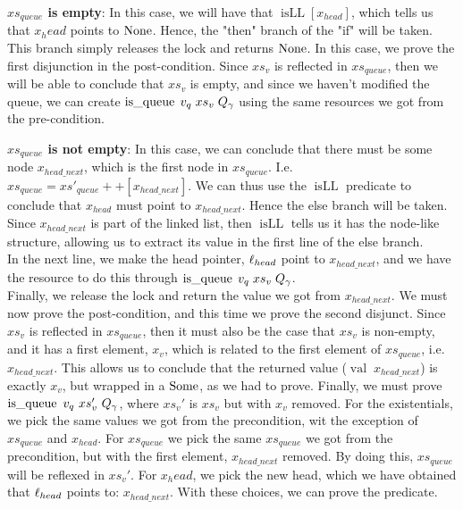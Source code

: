 \documentclass[twoside,11pt,openright]{report}
\newcommand{\isqueue}{\operatorname{is\_queue}}
\newcommand{\isLL}{\operatorname{isLL}}
\newcommand{\nVal}[1]{\operatorname{val} \; #1}
\begin{document}
\textbf{$xs_{queue}$ is empty}: In this case, we will have that $\isLL [x_{head}]$, which tells us that $x_head$ points to $\operatorname{None}$. Hence, the "then" branch of the "if" will be taken. This branch simply releases the lock and returns $\operatorname{None}$. In this case, we prove the first disjunction in the post-condition. Since $xs_v$ is reflected in $xs_{queue}$, then we will be able to conclude that $xs_v$ is empty, and since we haven't modified the queue, we can create $\isqueue \; v_q \; xs_v \; Q_\gname$ using the same resources we got from the pre-condition.

\textbf{$xs_{queue}$ is not empty}: In this case, we can conclude that there must be some node $x_{head\_next}$, which is the first node in $xs_{queue}$. I.e. $xs_{queue} = xs'_{queue} ++ [x_{head\_next}]$. We can thus use the $\isLL$ predicate to conclude that $x_{head}$ must point to $x_{head\_next}$. Hence the else branch will be taken. Since $x_{head\_next}$ is part of the linked list, then $\isLL$ tells us it has the node-like structure, allowing us to extract its value in the first line of the else branch.\\
In the next line, we make the head pointer, $\ell_{head}$ point to $x_{head\_next}$, and we have the resource to do this through $\isqueue \; v_q \; xs_v \; Q_\gname$.\\
Finally, we release the lock and return the value we got from $x_{head\_next}$. We must now prove the post-condition, and this time we prove the second disjunct. Since $xs_v$ is reflected in $xs_{queue}$, then it must also be the case that $xs_v$ is non-empty, and it has a first element, $x_v$, which is related to the first element of $xs_{queue}$, i.e. $x_{head\_next}$. This allows us to conclude that the returned value ($\nVal{x_{head\_next}}$) is exactly $x_v$, but wrapped in a $\operatorname{Some}$, as we had to prove. 
Finally, we must prove $\isqueue\ v_q\ xs_v'\ Q_\gname$, where $xs_v'$ is $xs_v$ but with $x_v$ removed. For the existentials, we pick the same values we got from the precondition, wit the exception of $xs_{queue}$ and $x_{head}$. For $xs_{queue}$ we pick the same $xs_{queue}$ we got from the precondition, but with the first element, $x_{head\_next}$ removed. By doing this, $xs_{queue}$ will be reflexed in $xs_v'$. For $x_head$, we pick the new head, which we have obtained that $\ell_{head}$ points to: $x_{head\_next}$. With these choices, we can prove the predicate.
\end{document}
